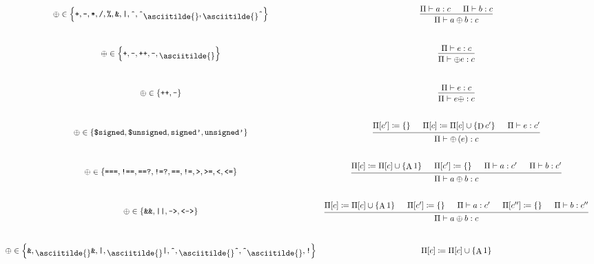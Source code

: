 \documentclass{article}
\DeclareMathOperator{\D}{D}
\DeclareMathOperator{\A}{A}
\newcommand{\mytilde}{\raisebox{-.7ex}{\asciitilde{}}}
\newcommand{\binOp}{\ensuremath{\left\{
      \texttt{+}, \texttt{-}, \texttt{*}, \texttt{/}, \texttt{\%}, \texttt{\&},
      \texttt{|}, \texttt{\^{}}, \texttt{\^{}}\mytilde, \mytilde\texttt{\^{}}
      \right\}}}
\newcommand{\preUnOp}{\ensuremath{\left\{
      \texttt{+}, \texttt{-}, \texttt{++}, \texttt{--}, \mytilde
    \right\}}}
\newcommand{\postUnOp}{\ensuremath{\left\{\texttt{++}, \texttt{--}\right\}}}
\newcommand{\cast}{\ensuremath{\left\{
      \texttt{\$signed}, \texttt{\$unsigned}, \texttt{signed'}, \texttt{unsigned'}
    \right\}}}
\newcommand{\comp}{\ensuremath{\left\{
      \texttt{===}, \texttt{!==}, \texttt{==?}, \texttt{!=?}, \texttt{==},
      \texttt{!=}, \texttt{>}, \texttt{>=}, \texttt{<}, \texttt{<=}
    \right\}}}
\newcommand{\logic}{\ensuremath{\left\{
      \texttt{\&\&}, \texttt{||}, \texttt{->}, \texttt{<->}
    \right\}}}
\newcommand{\red}{\ensuremath{\left\{
      \texttt{\&}, \mytilde\texttt{\&}, \texttt{|}, \mytilde\texttt{|}, \texttt{\^{}},
      \mytilde\texttt{\^{}}, \texttt{\^{}}\mytilde, \texttt{!}
    \right\}}}
\begin{document}
\begin{equation*}
    \def\arraystretch{4}
    \begin{array}{cc}
        \oplus \in \binOp
         &
        \begin{prooftree}
            \hypo{\Pi \vdash a: c}
            \hypo{\Pi \vdash b: c}
            \infer2{\Pi \vdash a \oplus b: c}
        \end{prooftree}
        \\
        \oplus \in \preUnOp
         &
        \begin{prooftree}
            \hypo{\Pi \vdash e: c}
            \infer1{\Pi \vdash \oplus e: c}
        \end{prooftree}
        \\
        \oplus \in \postUnOp
         &
        \begin{prooftree}
            \hypo{\Pi \vdash e: c}
            \infer1{\Pi \vdash e \oplus: c}
        \end{prooftree}
        \\
        \oplus \in \cast
         &
        \begin{prooftree}
            \hypo{\Pi[c'] \coloneq \left\{\right\}}
            \hypo{\Pi[c] \coloneq \Pi[c] \cup \left\{\D c'\right\}}
            \hypo{\Pi \vdash e: c'}
            \infer3{\Pi \vdash \oplus \left(e\right): c}
        \end{prooftree}
        \\
        \oplus \in \comp
         &
        \begin{prooftree}
            \hypo{\Pi[c] \coloneq \Pi[c] \cup \left\{\A 1\right\}}
            \hypo{\Pi[c'] \coloneq \left\{\right\}}
            \hypo{\Pi \vdash a: c'}
            \hypo{\Pi \vdash b: c'}
            \infer4{\Pi \vdash a \oplus b: c}
        \end{prooftree}
        \\
        \oplus \in \logic
         &
        \begin{prooftree}
            \hypo{\Pi[c] \coloneq \Pi[c] \cup \left\{\A 1\right\}}
            \hypo{\hypo{\Pi[c'] \coloneq \left\{\right\}}}
            \hypo{\Pi \vdash a: c'}
            \hypo{\hypo{\Pi[c''] \coloneq \left\{\right\}}}
            \hypo{\Pi \vdash b: c''}
            \infer5{\Pi \vdash a  \oplus b: c}
        \end{prooftree}
        \\
        \oplus \in \red
         &
        \begin{prooftree}
            \hypo{\Pi[c] \coloneq \Pi[c] \cup \left\{\A 1\right\}}

\end{prooftree}
\end{array}
\end{equation*}
\end{document}
